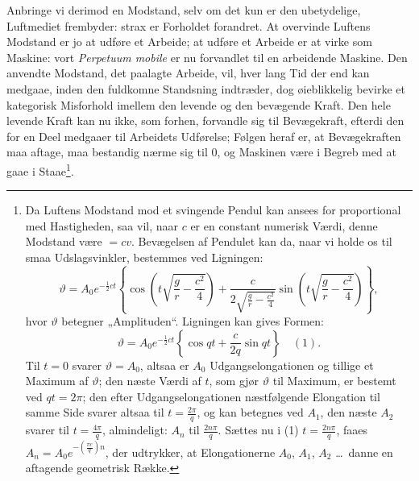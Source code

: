 \documentclass[11pt]{book}
\newcommand{\opage}[1]{\marginnote{\footnotesize\textit{[#1]}}}
\begin{document}
Anbringe vi derimod en Modstand, selv om det kun er den
ubetydelige, Luftmediet frembyder: strax er Forholdet forandret. At
overvinde Luftens Modstand er jo at udføre et Arbeide; at udføre et
Arbeide er at virke som Maskine: vort \textit{Perpetuum mobile} er nu
forvandlet til en arbeidende Maskine. Den anvendte Modstand, det
paalagte Arbeide, vil, hver lang Tid der end kan medgaae, inden den
fuldkomne Standsning indtræder, dog øieblikkelig bevirke et kategorisk
Misforhold imellem den levende og den bevægende Kraft. Den hele
levende Kraft kan nu ikke, som forhen, forvandle sig til Bevægekraft,
efterdi den for en Deel medgaaer til Arbeidets Udførelse; Følgen heraf
er, at Bevægekraften maa aftage, maa bestandig nærme sig til $0$, og
Maskinen være i Begreb med at gaae i Staae\footnote{Da Luftens Modstand
mod et svingende Pendul kan ansees for proportional med Hastigheden, saa vil,
naar $c$ er en constant numerisk Værdi, denne Modstand være $= cv$.
Bevægelsen af Pendulet kan da, naar vi holde os til smaa Udslagsvinkler,
bestemmes ved Ligningen:
\[ \vartheta = A_0 e^{-\frac{1}{2}ct}\left\{\cos\left(t\sqrt{\frac{g}{r}-\frac{c^2}{4}}\right)
 + \frac{c}{2\sqrt{\frac{g}{r}-\frac{c^2}{4}}}\sin\left(t\sqrt{\frac{g}{r}-\frac{c^2}{4}}\right)\right\}, \]
hvor $\vartheta$ betegner „Amplituden“. Ligningen kan gives Formen:
\[ \vartheta = A_0 e^{-\frac{1}{2}ct}\left\{\cos qt + \frac{c}{2q}\sin qt\right\}
 \quad (1). \]
Til $t = 0$ svarer $\vartheta = A_0$, altsaa er $A_0$ Udgangselongationen og
tillige et Maximum af $\vartheta$; den næste Værdi af $t$, som gjør
$\vartheta$ til Maximum, er bestemt ved $qt = 2\pi$; den efter
Udgangselongationen næstfølgende Elongation til samme Side svarer altsaa til
$t = \frac{2\pi}{q}$, og kan betegnes ved $A_1$, den næste $A_2$ svarer til
$t = \frac{4\pi}{q}$, almindeligt: $A_n$ til $\frac{2n\pi}{q}$. Sættes nu i
(1) $t = \frac{2n\pi}{q}$, faaes $A_n = A_0 e^{-\left(\frac{\pi c}{q}\right)n}$,
der udtrykker, at Elongationerne $A_0$, $A_1$, $A_2$ \dots\ danne en aftagende
geometrisk Række.}.
\opage{355} \setcounter{footnote}{0}%
\end{document}
